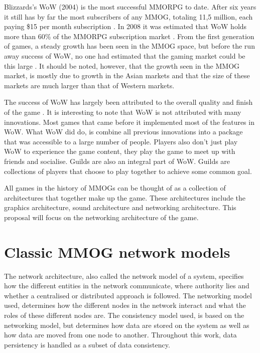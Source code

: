 \documentclass[journal,oneside,a4paper,onecolumn]{IEEEtran}
\begin{document}
Blizzards's \ac{WoW} (2004) is the most successful MMORPG to date. After six years it still has by far the most subscribers of any MMOG, totaling 11,5 million, each paying \$15 per month subscription \cite{wow_subscibers}. In 2008 it was estimated that WoW holds more than 60\% of the MMORPG subscription market \cite{mmog_sub_market}. From the first generation of games, a steady growth has been seen in the MMOG space, but before the run away success of WoW, no one had estimated that the gaming market could be this large \cite{mmog_growth_analysis}. It should be noted, however, that the growth seen in the \ac{MMOG} market, is mostly due to growth in the Asian markets and that the size of these markets are much larger than that of Western markets.

The success of \ac{WoW} has largely been attributed to the overall quality and finish of the game \cite{wow_gameplay}. It is interesting to note that WoW is not attributed with many innovations. Most games that came before it implemented most of the features in WoW. What WoW did do, is combine all previous innovations into a package that was accessible to a large number of people.  Players also don't just play WoW to experience the game content, they play the game to meet up with friends and socialise. Guilds are also an integral part of WoW. Guilds are collections of players that choose to play together to achieve some common goal.

All games in the history of \acp{MMOG} can be thought of as a collection of architectures that together make up the game. These architectures include the graphics architecture, sound architecture and networking architecture. This proposal will focus on the networking architecture of the game.


\section{Classic MMOG network models}
\label{classic_network_models}

The network architecture, also called the network model of a system, specifies how the different entities in the network communicate, where authority lies and whether a centralised or distributed approach is followed. The networking model used, determines how the different nodes in the network interact and what the roles of these different nodes are. The consistency model used, is based on the networking model, but determines how data are stored on the system as well as how data are moved from one node to another. Throughout this work, data persistency is handled as a subset of data consistency.
\end{document}

